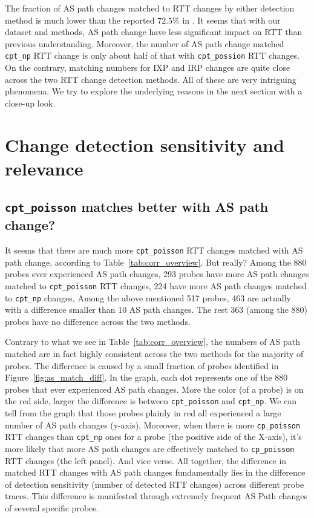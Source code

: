 The fraction of AS path changes matched to RTT changes by either detection method is much lower than the reported $72.5\%$ in \cite{Rimondini2014}.
It seems that with our dataset and methods, AS path change have less significant impact on RTT than previous understanding.
Moreover, the number of AS path change matched \texttt{cpt\_np} RTT change is only about half of that with \texttt{cpt\_possion} RTT changes.
On the contrary, matching numbers for IXP and \ac{IRP} changes are quite close across the two RTT change detection methods.
All of these are very intriguing phenomena.
We try to explore the underlying reasons in the next section with a close-up look.

\section{Change detection sensitivity and relevance}
\subsection{\texttt{cpt\_poisson} matches better with AS path change?}
\label{sec:as_match_diff}
It seems that there are much more \texttt{cpt\_poisson} RTT changes matched with AS path change, according to Table~\ref{tab:corr_overview}. But really?
Among the 880 probes ever experienced AS path changes, 293 probes have more AS path changes matched to \texttt{cpt\_poisson} RTT changes, 224 have more AS path changes matched to \texttt{cpt\_np} changes, 
Among the above mentioned 517 probes, 463 are actually with a difference smaller than 10 AS path changes.
The rest 363 (among the 880) probes have no difference across the two methods.

Contrary to what we see in Table~\ref{tab:corr_overview}, the numbers of AS path matched are in fact highly consistent across the two methods for the majority of probes.
The difference is caused by a small fraction of probes identified in Figure~\ref{fig:as_match_diff}.
In the graph, each dot represents one of the 880 probes that ever experienced AS path changes.
More the color (of a probe) is on the red side, larger the difference is between \texttt{cpt\_poisson} and \texttt{cpt\_np}.
We can tell from the graph that those probes plainly in red all experienced a large number of AS path changes (y-axis).
Moreover, when there is more \texttt{cp\_poisson} RTT changes than \texttt{cpt\_np} ones for a probe (the positive side of the X-axis), it's more likely that more AS path changes are effectively matched to \texttt{cp\_poisson} RTT changes (the left panel).
And vice verse.
All together, the difference in matched RTT changes with AS path changes fundamentally lies in the difference of detection sensitivity (number of detected RTT changes) across different probe traces.
This difference is manifested through extremely frequent AS Path changes of several specific probes.


